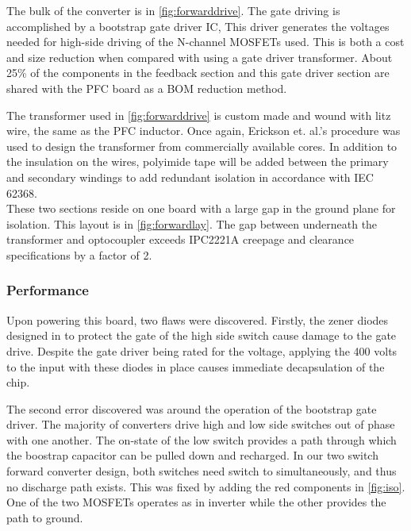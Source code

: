 \documentclass[15pt]{article}
\begin{document}
The bulk of the converter is in \autoref{fig:forwarddrive}. The gate driving is accomplished by a bootstrap gate driver IC, This driver generates the voltages needed for high-side driving of the N-channel MOSFETs used. This is both a cost and size reduction when compared with using a gate driver transformer. About 25\% of the components in the feedback section and this gate driver section are shared with the PFC board as a BOM reduction method.

The transformer used in \autoref{fig:forwarddrive} is custom made and wound with litz wire, the same as the PFC inductor. Once again, Erickson et. al.’s\cite{2} procedure was used to design the transformer from commercially available cores. In addition to the insulation on the wires, polyimide tape will be added between the primary and secondary windings to add redundant isolation in accordance with IEC 62368\cite{5}.\\

These two sections reside on one board with a large gap in the ground plane for isolation. This layout is in \autoref{fig:forwardlay}. The gap between underneath the transformer and optocoupler exceeds IPC2221A\cite{6} creepage and clearance specifications by a factor of 2.

\subsubsection{Performance}
Upon powering this board, two flaws were discovered. Firstly, the zener diodes designed in to protect the gate of the high side switch cause damage to the gate drive. Despite the gate driver being rated for the voltage, applying the 400 volts to the input with these diodes in place causes immediate decapsulation of the chip. 

The second error discovered was around the operation of the bootstrap gate driver. The majority of converters drive high and low side switches out of phase with one another. The on-state of the low switch provides a path through which the boostrap capacitor can be pulled down and recharged. In our two switch forward converter design, both switches need switch to simultaneously, and thus no discharge path exists. This was fixed by adding the red components in \autoref{fig:iso}. One of the two MOSFETs operates as in inverter while the other provides the path to ground.
\end{document}
